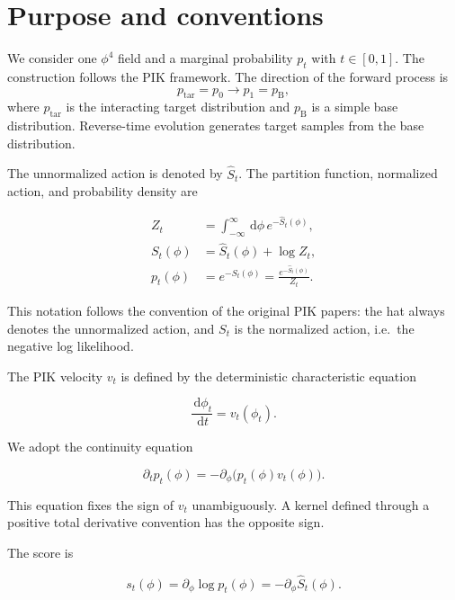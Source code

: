 \documentclass[reprint,twocolumn,superscriptaddress,preprintnumbers,amsmath,amssymb,aps,prd,floatfix]{revtex4-2}
\newcommand{\dd}{\,\mathrm{d}}
\begin{document}
\section{Purpose and conventions}

We consider one $\phi^4$ field and a marginal probability $p_t$ with $t\in[0,1]$. The construction follows the PIK framework. The direction of the forward process is
\begin{equation}
 p_{\mathrm{tar}}=p_0
 \longrightarrow
 p_1=p_{\mathrm{B}},
\end{equation}
where $p_{\mathrm{tar}}$ is the interacting target distribution and $p_{\mathrm{B}}$ is a simple base distribution. Reverse-time evolution generates target samples from the base distribution.

The unnormalized action is denoted by $\hat S_t$. The partition function, normalized action, and probability density are

\begin{align}
 Z_t
 &=
 \int_{-\infty}^{\infty}\dd\phi\,e^{-\hat S_t(\phi)},
 \\
 S_t(\phi)
 &=
 \hat S_t(\phi)+\log Z_t,
 \\
 p_t(\phi)
 &=
 e^{-S_t(\phi)}
 =
 \frac{e^{-\hat S_t(\phi)}}{Z_t}.
\end{align}

This notation follows the convention of the original PIK papers: the hat always denotes the unnormalized action, and $S_t$ is the normalized action, i.e.\ the negative log likelihood.

The PIK velocity $v_t$ is defined by the deterministic characteristic equation

\begin{equation}
 \frac{\dd\phi_t}{\dd t}
 =
 v_t(\phi_t).
\end{equation}

We adopt the continuity equation

\begin{equation}
 \partial_t p_t(\phi)
 =
 -\partial_\phi\bigl(p_t(\phi)v_t(\phi)\bigr).
 \label{eq:continuity}
\end{equation}

This equation fixes the sign of $v_t$ unambiguously. A kernel defined through a positive total derivative convention has the opposite sign.

The score is

\begin{equation}
 s_t(\phi)
 =
 \partial_\phi\log p_t(\phi)
 =
 -\partial_\phi\hat S_t(\phi).
 \label{eq:score}
\end{equation}
\end{document}
